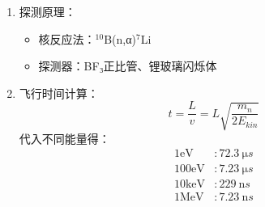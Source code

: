 \documentclass{article}
\begin{document}
\begin{enumerate}
\begin{enumerate}
    \item 探测原理：
    \begin{itemize}
      \item 核反应法：$^{10}$B(n,α)$^7$Li
      \item 探测器：BF₃正比管、锂玻璃闪烁体
    \end{itemize}
    
    \item 飞行时间计算：
    $$
      t = \frac{L}{v} = L \sqrt{\frac{m_n}{2E_{kin}}}
    $$
    代入不同能量得：
    \begin{align*}
      1 \text{eV} & : \SI{72.3}{\micro s} \\
      100 \text{eV} & : \SI{7.23}{\micro s} \\
      10 \text{keV} & : \SI{229}{\nano s} \\
      1 \text{MeV} & : \SI{7.23}{\nano s}
    \end{align*}
  \end{enumerate}
\end{enumerate}
\end{document}
